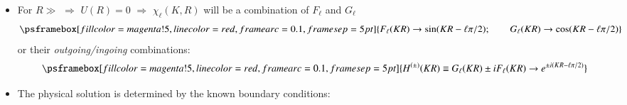 \begin{itemize}
\item For $R\gg$  $\Rightarrow$ $U(R)=0$ $\Rightarrow$ $\chi_{\ell}(K,R)$ will be a combination of $F_\ell$ and $G_\ell$
$$
\psframebox[fillcolor=magenta!5,linecolor=red,framearc=0.1,framesep=5pt]{
 F_\ell(K R) \rightarrow \sin(KR-\ell \pi/2);
\quad \quad G_\ell(KR) \rightarrow \cos (KR -\ell \pi/2) 
}%
$$ 
or their {\it outgoing/ingoing} combinations:
$$
\psframebox[fillcolor=magenta!5,linecolor=red,framearc=0.1,framesep=5pt]{
H^{(\pm)}(KR) \equiv G_\ell(KR)  \pm i F_\ell (KR)   \rightarrow e^{\pm i (KR - \ell \pi/2)}
}
$$






\item The physical solution is determined by the known boundary conditions:
\vspace{0.25cm}


\end{itemize}
